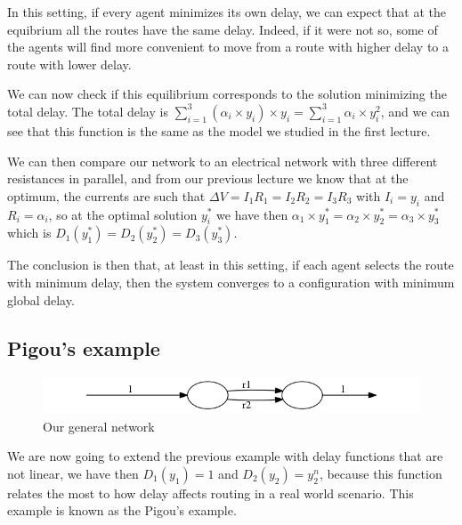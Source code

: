 In this setting, if every agent minimizes its own delay, we can expect that at the equibrium all the routes have the same delay. Indeed, if it were not so, some of the agents will find more convenient to move from a route with higher delay to a route with lower delay.

We can now check if this equilibrium corresponds to the solution minimizing the total delay.
The total delay is $\sum\limits_{i=1}^{3} (\alpha_i \times y_i) \times y_i = \sum\limits_{i=1}^{3} \alpha_i \times y^2_i $, and we can see that this function is the same as the model we studied in the first lecture.

We can then compare our network to an electrical network with three different resistances in parallel, and from our previous lecture we know that at the optimum, the currents are such that $ \Delta V = I_1 R_1 = I_2 R_2 = I_3 R_3 $ with $I_i = y_i $ and  $ R_i = \alpha_i $, so at the optimal solution $y^*_i$ we have then $\alpha_1 \times y^*_1 = \alpha_2 \times y^*_2 = \alpha_3 \times y^*_3$ which is  $ D_1(y^*_1) = D_2(y^*_2) = D_3(y^*_3)$.


The conclusion is then that, at least in this setting, if each agent selects the route with minimum delay, then the system converges to a configuration with minimum global delay.

\subsection{Pigou's example}

\begin{figure}[h]
\centering
\includegraphics[scale=0.5]{output2.png}
\caption{Our general network}
\end{figure}

We are now going to extend the previous example with delay functions that are not linear, we have then $D_1(y_1) = 1$ and $D_2(y_2) = y^n_2 $, because this function relates the most to how delay affects routing in a real world scenario. This example is known as the Pigou's  example.

